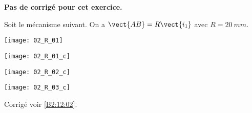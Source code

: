 \normaltrue
\correctiontrue


\setcounter{question}{0}
\ifcorrection
\else
\textbf{Pas de corrigé pour cet exercice.}
\fi

\ifprof
\else
Soit le mécanisme suivant. On a $\vect{AB}=R\vect{i_1}$ avec $R=\SI{20}{mm}$. 
\begin{center}
\texttt{[image: 02\_R\_01]}
\end{center}
\fi

\ifprof
\begin{multicols}{3}
\else
\fi
{}
\ifprof
\begin{center}
\texttt{[image: 02\_R\_01\_c]}
\end{center}
\vfill\null
\columnbreak
\else
\fi

\ifprof
\begin{center}
\texttt{[image: 02\_R\_02\_c]}
\end{center}
\vfill\null
\columnbreak
\else
\fi

\ifprof
\begin{center}
\texttt{[image: 02\_R\_03\_c]}
\end{center}
\else
\fi



\ifprof
\end{multicols}
\else
\fi

\ifprof
\else
\begin{flushright}
\footnotesize{Corrigé  voir \ref{B2:12:02}.}
\end{flushright}%
\fi